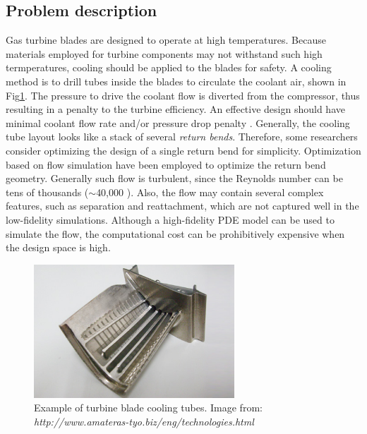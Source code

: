 \documentclass[a4paper,onecolumn]{article}
\theoremstyle{remark}
\begin{document}
\subsection{Problem description}
\noindent Gas turbine blades are designed to operate at high temperatures. Because 
materials employed for turbine components may not withstand such high termperatures,
cooling should be applied to the blades for safety. A cooling method is
to drill tubes inside the blades to circulate the coolant air, shown in Fig\ref{fig: ubend picture}.
The pressure to drive the coolant flow is diverted from the compressor, thus resulting
in a penalty to the turbine efficiency.
An effective design should have minimal coolant flow rate and/or pressure drop penalty 
\cite{ubend rans opt 1, ubend rans opt 2}.
Generally, the cooling tube layout looks like a stack of several \emph{return bends}.
Therefore, some researchers consider optimizing the design of a single return bend
for simplicity. Optimization based on flow simulation have been employed to optimize
the return bend geometry. Generally such flow is turbulent, since the Reynolds number 
can be tens of thousands ($\sim$40,000 \cite{ubend rans opt 2}). 
Also, the flow may contain several complex
features, such as separation and reattachment, which are not captured well in the low-fidelity
simulations. Although a high-fidelity PDE model can be used to simulate the flow, 
the computational cost can be prohibitively expensive when the design space is high. 
\begin{figure}[H]\begin{center}
    \includegraphics[height=5cm]{ubend.png}
    \caption{Example of turbine blade cooling tubes.
    Image from: \emph{http://www.amateras-tyo.biz/eng/technologies.html}}
    \label{fig: ubend picture}
\end{center}\end{figure}
\end{document}
